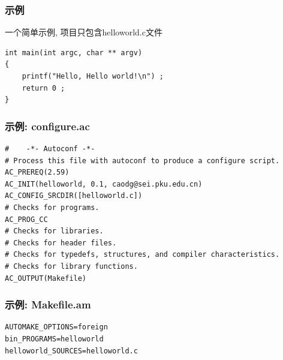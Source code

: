 \documentclass[compress]{beamer}
\begin{document}
\begin{frame}[containsverbatim]
  \frametitle{示例}
  一个简单示例, 项目只包含helloworld.c文件 \\

\begin{Verbatim}
int main(int argc, char ** argv)
{
	printf("Hello, Hello world!\n") ;
	return 0 ;
}
\end{Verbatim}
  
\end{frame}

\begin{frame}[containsverbatim]
  \frametitle{示例: configure.ac}

\begin{Verbatim}[fontsize=\footnotesize]
#    -*- Autoconf -*-
# Process this file with autoconf to produce a configure script.
AC_PREREQ(2.59)
AC_INIT(helloworld, 0.1, caodg@sei.pku.edu.cn)
AC_CONFIG_SRCDIR([helloworld.c])
# Checks for programs.
AC_PROG_CC
# Checks for libraries.
# Checks for header files.
# Checks for typedefs, structures, and compiler characteristics.
# Checks for library functions.
AC_OUTPUT(Makefile)
\end{Verbatim}
\end{frame}

\begin{frame}[containsverbatim]
  \frametitle{示例: Makefile.am}

\begin{Verbatim}
AUTOMAKE_OPTIONS=foreign
bin_PROGRAMS=helloworld
helloworld_SOURCES=helloworld.c
\end{Verbatim}
\end{frame}
\end{document}
